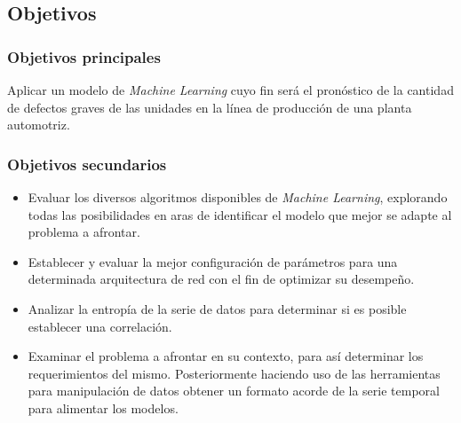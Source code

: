 \documentclass[a4paper,12pt]{article}
\begin{document}
\clearpage

\subsection{Objetivos}
\subsubsection{Objetivos principales}
Aplicar un modelo de \textit{Machine Learning} cuyo fin será el pronóstico de la cantidad de defectos graves de las unidades en la línea de producción de una planta automotriz.

\subsubsection{Objetivos secundarios}

\begin{itemize}
	\item Evaluar los diversos algoritmos disponibles de \textit{Machine Learning}, explorando todas las posibilidades en aras de identificar el modelo que mejor se adapte al problema a afrontar.
	      	      	      	
	      	      	      	
	\item Establecer y evaluar la mejor configuración de parámetros para una determinada arquitectura de red con el fin de optimizar su desempeño.
	      	      	      	
	      	      	      	
	\item Analizar la entropía de la serie de datos para determinar si es posible establecer una correlación.
	      	      	      	
	\item Examinar el problema a afrontar en su contexto, para así determinar los requerimientos del mismo. Posteriormente haciendo uso de las herramientas para manipulación de datos obtener un formato acorde de la serie temporal para alimentar los modelos.
	      	      	      	
\end{itemize}
\end{document}
